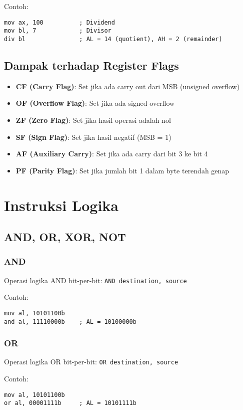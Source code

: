 \documentclass[../main.tex]{subfiles}
\begin{document}
Contoh:
\begin{verbatim}
mov ax, 100          ; Dividend
mov bl, 7            ; Divisor
div bl               ; AL = 14 (quotient), AH = 2 (remainder)
\end{verbatim}

\subsection{Dampak terhadap Register Flags}
\begin{itemize}
    \item \textbf{CF (Carry Flag)}: Set jika ada carry out dari MSB (unsigned overflow)
    \item \textbf{OF (Overflow Flag)}: Set jika ada signed overflow
    \item \textbf{ZF (Zero Flag)}: Set jika hasil operasi adalah nol
    \item \textbf{SF (Sign Flag)}: Set jika hasil negatif (MSB = 1)
    \item \textbf{AF (Auxiliary Carry)}: Set jika ada carry dari bit 3 ke bit 4
    \item \textbf{PF (Parity Flag)}: Set jika jumlah bit 1 dalam byte terendah genap
\end{itemize}

\section{Instruksi Logika}\label{sec:instruksi-dasar-logika}
\subsection{AND, OR, XOR, NOT}
\subsubsection{AND}
Operasi logika AND bit-per-bit: \texttt{AND destination, source}

Contoh:
\begin{verbatim}
mov al, 10101100b
and al, 11110000b    ; AL = 10100000b
\end{verbatim}

\subsubsection{OR}
Operasi logika OR bit-per-bit: \texttt{OR destination, source}

Contoh:
\begin{verbatim}
mov al, 10101100b
or al, 00001111b     ; AL = 10101111b
\end{verbatim}
\end{document}
